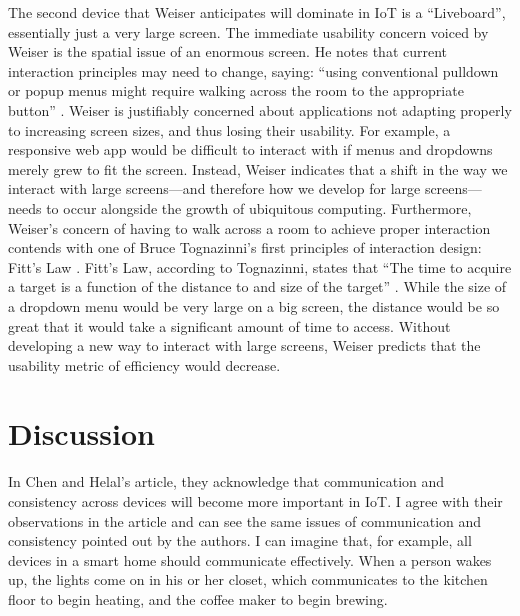 \documentclass[11pt, oneside]{article}   	%
\begin{document}
The second device that Weiser anticipates will dominate in IoT is a ``Liveboard'', essentially just a very large screen. The immediate usability concern voiced by Weiser is the spatial issue of an enormous screen. He notes that current interaction principles may need to change, saying: ``using conventional pulldown or popup menus might require walking across the room to the appropriate button'' \cite{weiser}. Weiser is justifiably concerned about applications not adapting properly to increasing screen sizes, and thus losing their usability. For example, a responsive web app would be difficult to interact with if menus and dropdowns merely grew to fit the screen. Instead, Weiser indicates that a shift in the way we interact with large screens---and therefore how we develop for large screens---needs to occur alongside the growth of ubiquitous computing. Furthermore, Weiser's concern of having to walk across a room to achieve proper interaction contends with one of Bruce Tognazinni's first principles of interaction design: Fitt's Law \cite{asktog}. Fitt's Law, according to Tognazinni, states that ``The time to acquire a target is a function of the distance to and size of the target'' \cite{asktog}. While the size of a dropdown menu would be very large on a big screen, the distance would be so great that it would take a significant amount of time to access. Without developing a new way to interact with large screens, Weiser predicts that the usability metric of efficiency would decrease.

\section{Discussion}
In Chen and Helal's article, they acknowledge that communication and consistency across devices will become more important in IoT. I agree with their observations in the article and can see the same issues of communication and consistency pointed out by the authors. I can imagine that, for example, all devices in a smart home should communicate effectively. When a person wakes up, the lights come on in his or her closet, which communicates to the kitchen floor to begin heating, and the coffee maker to begin brewing.
\end{document}
